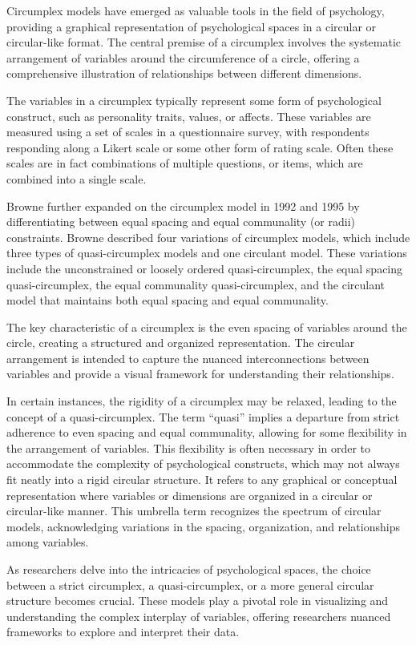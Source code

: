 \documentclass[
  authoryear,
  preprint,
  3p]{elsarticle}
\begin{document}
Circumplex models have emerged as valuable tools in the field of
psychology, providing a graphical representation of psychological spaces
in a circular or circular-like format. The central premise of a
circumplex involves the systematic arrangement of variables around the
circumference of a circle, offering a comprehensive illustration of
relationships between different dimensions.

The variables in a circumplex typically represent some form of
psychological construct, such as personality traits, values, or affects.
These variables are measured using a set of scales in a questionnaire
survey, with respondents responding along a Likert scale or some other
form of rating scale. Often these scales are in fact combinations of
multiple questions, or items, which are combined into a single scale.

Browne further expanded on the circumplex model in 1992 and 1995 by
differentiating between equal spacing and equal communality (or radii)
constraints. Browne described four variations of circumplex models,
which include three types of quasi-circumplex models and one circulant
model. These variations include the unconstrained or loosely ordered
quasi-circumplex, the equal spacing quasi-circumplex, the equal
communality quasi-circumplex, and the circulant model that maintains
both equal spacing and equal communality.

The key characteristic of a circumplex is the even spacing of variables
around the circle, creating a structured and organized representation.
The circular arrangement is intended to capture the nuanced
interconnections between variables and provide a visual framework for
understanding their relationships.

In certain instances, the rigidity of a circumplex may be relaxed,
leading to the concept of a quasi-circumplex. The term ``quasi'' implies
a departure from strict adherence to even spacing and equal communality,
allowing for some flexibility in the arrangement of variables. This
flexibility is often necessary in order to accommodate the complexity of
psychological constructs, which may not always fit neatly into a rigid
circular structure. It refers to any graphical or conceptual
representation where variables or dimensions are organized in a circular
or circular-like manner. This umbrella term recognizes the spectrum of
circular models, acknowledging variations in the spacing, organization,
and relationships among variables.

As researchers delve into the intricacies of psychological spaces, the
choice between a strict circumplex, a quasi-circumplex, or a more
general circular structure becomes crucial. These models play a pivotal
role in visualizing and understanding the complex interplay of
variables, offering researchers nuanced frameworks to explore and
interpret their data.
\end{document}
